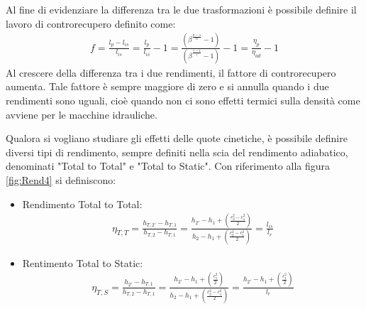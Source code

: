 Al fine di evidenziare la differenza tra le due trasformazioni è possibile definire il lavoro di controrecupero definito come:
\begin{align*}
f = \frac{l_p - l_{is}}{l_{is}} = \frac{l_p}{l_{is}} -1 = \frac{\left( \beta^{\frac{n-1}{n}} -1 \right)}{\left( \beta^{\frac{\gamma-1}{\gamma}} -1 \right)} -1 = \frac{\eta_p}{\eta_{ad}} -1
\end{align*}
Al crescere della differenza tra i due rendimenti, il fattore di controrecupero aumenta. Tale fattore è sempre maggiore di zero e si annulla quando i due rendimenti sono uguali, cioè quando non ci sono effetti termici sulla densità come avviene per le macchine idrauliche.

Qualora si vogliano studiare gli effetti delle quote cinetiche, è possibile definire diversi tipi di rendimento, sempre definiti nella scia del rendimento adiabatico, denominati "Total to Total" e "Total to Static". Con riferimento alla figura \ref{fig:Rend4} si definiscono:
\begin{itemize}
\item Rendimento Total to Total:
\begin{align*}
\eta_{T,T} = \frac{h_{T,2'} - h_{T,1}}{h_{T,2} - h_{T,1}} = \frac{h_{2'} - h_1 + \left( \frac{c_2^2 - c_1^2}{2} \right)}{h_2 - h_1 + \left( \frac{c_2^2 - c_1^2}{2} \right)} = \frac{l_{is}}{l_r}
\end{align*}
\item Rentimento Total to Static:
\begin{align*}
\eta_{T,S} = \frac{h_{2'} - h_{T,1}}{h_{T,2} - h_{T,1}} = \frac{h_{2'} - h_1 + \left( \frac{ c_1^2}{2} \right)}{h_2 - h_1 + \left( \frac{c_2^2 - c_1^2}{2} \right)} = \frac{h_{2'} - h_1 + \left( \frac{c_1^2}{2} \right)}{l_r}
\end{align*}
\end{itemize}
\pagebreak
